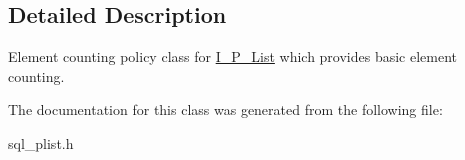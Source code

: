 \subsection{Detailed Description}
Element counting policy class for \mbox{\hyperlink{classI__P__List}{I\+\_\+\+P\+\_\+\+List}} which provides basic element counting. 

The documentation for this class was generated from the following file\+:\begin{DoxyCompactItemize}
\item 
sql\+\_\+plist.\+h\end{DoxyCompactItemize}
